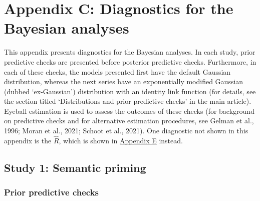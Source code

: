 \documentclass[
  12pt,
  man,floatsintext]{apa7}
\begin{document}
\clearpage

\renewcommand{\thefigure}{C\arabic{figure}} \setcounter{figure}{0}
\renewcommand{\thetable}{C\arabic{table}} \setcounter{table}{0}

\hypertarget{appendix-C-Bayesian-analysis-diagnostics}{%
\section{Appendix C: Diagnostics for the Bayesian analyses}\label{appendix-C-Bayesian-analysis-diagnostics}}

This appendix presents diagnostics for the Bayesian analyses. In each study, prior predictive checks are presented before posterior predictive checks. Furthermore, in each of these checks, the models presented first have the default Gaussian distribution, whereas the next series have an exponentially modified Gaussian (dubbed `ex-Gaussian') distribution with an identity link function (for details, see the section titled `Distributions and prior predictive checks' in the main article). Eyeball estimation is used to assess the outcomes of these checks (for background on predictive checks and for alternative estimation procedures, see Gelman et al., 1996; Moran et al., 2021; Schoot et al., 2021). One diagnostic not shown in this appendix is the \(\widehat R\), which is shown in \protect\hyperlink{appendix-E-Bayesian-analysis-results}{\underline{Appendix E}} instead.

\hypertarget{study1-bayesian-diagnostics}{%
\subsection{Study 1: Semantic priming}\label{study1-bayesian-diagnostics}}

\hypertarget{prior-predictive-checks}{%
\subsubsection{Prior predictive checks}\label{prior-predictive-checks}}
\end{document}
